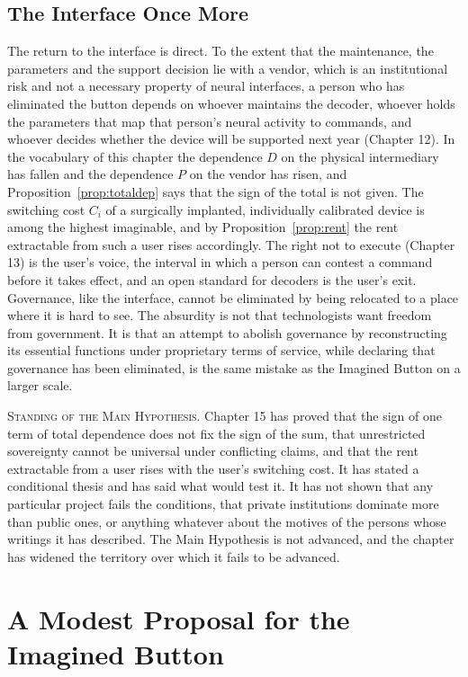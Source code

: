 \documentclass[11pt,twoside,openany]{book}
\theoremstyle{definition}
\theoremstyle{remark}
\newenvironment{standing}{\par\medskip\noindent\hrulefill\par\smallskip\noindent\textsc{Standing of the Main Hypothesis.}\enspace}{\par\smallskip\noindent\hrulefill\par\medskip}
\begin{document}
\section{The Interface Once More}

The return to the interface is direct. To the extent that the maintenance, the parameters and the support decision lie with a vendor, which is an institutional risk and not a necessary property of neural interfaces, a person who has eliminated the button depends on whoever maintains the decoder, whoever holds the parameters that map that person's neural activity to commands, and whoever decides whether the device will be supported next year (Chapter 12). In the vocabulary of this chapter the dependence $D$ on the physical intermediary has fallen and the dependence $P$ on the vendor has risen, and Proposition~\ref{prop:totaldep} says that the sign of the total is not given. The switching cost $C_i$ of a surgically implanted, individually calibrated device is among the highest imaginable, and by Proposition~\ref{prop:rent} the rent extractable from such a user rises accordingly. The right not to execute (Chapter 13) is the user's voice, the interval in which a person can contest a command before it takes effect, and an open standard for decoders is the user's exit. Governance, like the interface, cannot be eliminated by being relocated to a place where it is hard to see. The absurdity is not that technologists want freedom from government. It is that an attempt to abolish governance by reconstructing its essential functions under proprietary terms of service, while declaring that governance has been eliminated, is the same mistake as the Imagined Button on a larger scale.

\begin{standing}
Chapter 15 has proved that the sign of one term of total dependence does not fix the sign of the sum, that unrestricted sovereignty cannot be universal under conflicting claims, and that the rent extractable from a user rises with the user's switching cost. It has stated a conditional thesis and has said what would test it. It has not shown that any particular project fails the conditions, that private institutions dominate more than public ones, or anything whatever about the motives of the persons whose writings it has described. The Main Hypothesis is not advanced, and the chapter has widened the territory over which it fails to be advanced.
\end{standing}

\chapter{A Modest Proposal for the Imagined Button}
\end{document}
